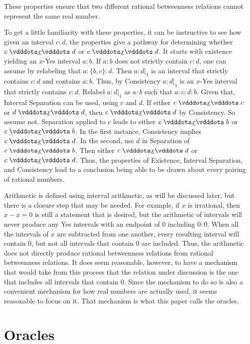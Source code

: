 \documentclass[12pt]{article}
\begin{document}
These properties ensure that two different rational betweenness relations cannot represent the same real number. 

To get a little familiarity with these properties, it can be instructive to see how given an interval $c:d$, the properties give a pathway for determining whether $c \xrel d$ or \sout{$c \xrel d$}. It starts with existence yielding an $x$-Yes interval $a:b$. If $a:b$ does not strictly contain $c:d$, one can assume by relabeling that $a:\{b, c\} :d$. Then $a:d|_1$ is an interval that strictly contains $c:d$ and contains $a:b$. Thus, by Consistency $a:d|_1$ is an $x$-Yes interval that strictly contains $c:d$. Relabel $a:d|_1$ as $a:b$ such that $a:c:d:b$. Given that, Interval Separation can be used, using $c$ and $d$. If either $c \xrel c$ or $d \xrel d$, then $c \xrel d$ by Consistency. So assume not. Separation applied to $c$ leads to either \sout{$c \xrel b$} or $c \xrel b$. In the first instance, Consistency implies \sout{$c \xrel d$}. In the second, use $d$ in Separation of $c \xrel b$. Then either $c \xrel d$ or \sout{$c \xrel d$}. Thus, the properties of Existence, Interval Separation, and Consistency lead to a conclusion being able to be drawn about every pairing of rational numbers. 


Arithmetic is defined using interval arithmetic, as will be discussed later, but there is a closure step that may be needed. For example, if $x$ is irrational, then $x - x = 0$ is still a statement that is desired, but the arithmetic of intervals will never produce any Yes intervals with an endpoint of $0$ including $0:0$. When all the intervals of $x$ are subtracted from one another, every resulting interval will contain 0, but not all intervals that contain 0 are included. Thus, the arithmetic does not directly produce rational betweenness relations from rational betweenness relations. It does seem reasonable, however, to have a mechanism that would take from this process that the relation under discussion is the one that includes all intervals that contain $0$. Since the mechanism to do so is also a convenient mechanism for how real numbers are actually used, it seems reasonable to focus on it. That mechanism is what this paper calls the oracles.  

\section{Oracles}
\end{document}
